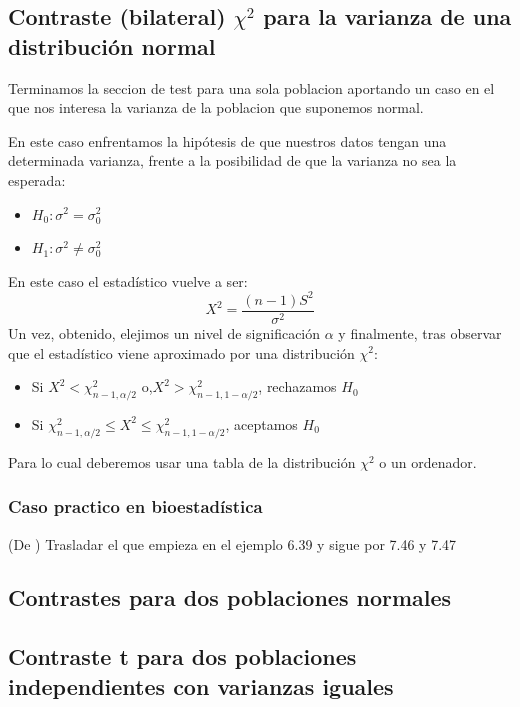 \documentclass[a4paper,12pt]{article}
\begin{document}
\subsection{Contraste (bilateral) $\chi^2$ para la varianza de una distribución normal}

Terminamos la seccion de test para una sola poblacion aportando un caso en el que nos interesa la varianza de la poblacion que suponemos normal.

En este caso enfrentamos la hipótesis de que nuestros datos tengan una determinada varianza, frente a la posibilidad  de que la varianza no sea la esperada: 
\begin{itemize}
	\item $H_0:\sigma^2=\sigma^2_0$
	\item $H_1: \sigma^2\neq\sigma^2_0$
\end{itemize}

En este caso el estadístico vuelve a ser: 
$$X^2=\frac{(n-1)S^2}{\sigma^2}$$
Un vez, obtenido, elejimos un nivel de significación $\alpha$ y finalmente, tras observar que el estadístico viene aproximado por una distribución $\chi^2$:
\begin{itemize}
	\item Si $X^2<\chi^2_{n-1,\alpha/2}$ o,$X^2>\chi^2_{n-1,1-\alpha/2}$, rechazamos $H_0$
	\item Si $\chi^2_{n-1,\alpha/2}\leq X^2\leq\chi^2_{n-1,1-\alpha/2}$, aceptamos $H_0$
\end{itemize}
Para lo cual deberemos usar una tabla de la distribución $\chi^2$ o un ordenador.

 \subsubsection*{Caso practico en bioestadística}
(De \cite{rosner2015fundamentals}) Trasladar el que empieza en el ejemplo 6.39 y sigue por 7.46 y 7.47


\subsection{Contrastes para dos poblaciones normales}
\subsection{Contraste t  para dos poblaciones independientes con varianzas iguales}
\end{document}
